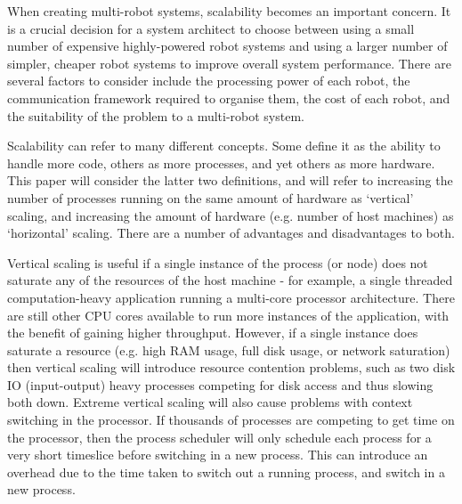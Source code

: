 \documentclass[../dissertation.tex]{subfiles}
\begin{document}
When creating multi-robot systems, scalability becomes an important concern\cite{klavins2004communication}. It is a crucial decision for a system architect to choose between using a small number of expensive highly-powered robot systems and using a larger number of simpler, cheaper robot systems to improve overall system performance. There are several factors to consider include the processing power of each robot, the communication framework required to organise them, the cost of each robot, and the suitability of the problem to a multi-robot system.

Scalability can refer to many different concepts. Some define it as the ability to handle more code, others as more processes, and yet others as more hardware\cite{Bondi:2000:CSI:350391.350432}. This paper will consider the latter two definitions, and will refer to increasing the number of processes running on the same amount of hardware as `vertical' scaling, and increasing the amount of hardware (e.g. number of host machines) as `horizontal' scaling. There are a number of advantages and disadvantages to both.

Vertical scaling is useful if a single instance of the process (or node) does not saturate any of the resources of the host machine - for example, a single threaded computation-heavy application running a multi-core processor architecture. There are still other CPU cores available to run more instances of the application, with the benefit of gaining higher throughput. However, if a single instance does saturate a resource (e.g. high RAM usage, full disk usage, or network saturation) then vertical scaling will introduce resource contention problems, such as two disk IO (input-output) heavy processes competing for disk access and thus slowing both down. Extreme vertical scaling will also cause problems with context switching in the processor. If thousands of processes are competing to get time on the processor, then the process scheduler will only schedule each process for a very short timeslice before switching in a new process. This can introduce an overhead due to the time taken to switch out a running process, and switch in a new process.
\end{document}
